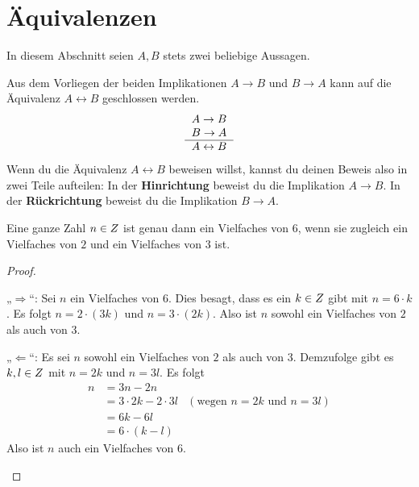 \section{Äquivalenzen}


In diesem Abschnitt seien $A,B$ stets zwei beliebige Aussagen.


\begin{axiom} \label{hinruck}   
    Aus dem Vorliegen der beiden Implikationen $A\to B$ und $B\to A$ kann auf die Äquivalenz $A\leftrightarrow B$ geschlossen werden.
    \[\begin{tabular}{r}
        $A\to B$ \\
        $B\to A$ \\
        \hline
        $A\leftrightarrow B$
    \end{tabular}\]
    Wenn du die Äquivalenz $A\leftrightarrow B$ beweisen willst, kannst du deinen Beweis also in zwei Teile aufteilen: In der \textbf{Hinrichtung} beweist du die Implikation $A\to B$. In der \textbf{Rückrichtung} beweist du die Implikation $B\to A$.
\end{axiom}


\begin{bsp} \label{bsp:hinruck}
    Eine ganze Zahl $n\in \relax Z$ ist genau dann ein Vielfaches von $6$, wenn sie zugleich ein Vielfaches von $2$ und ein Vielfaches von $3$ ist.
\end{bsp}
\begin{proof}
    \begin{labeling}
        \item[„$\Rightarrow$“:] Sei $n$ ein Vielfaches von $6$. Dies besagt, dass es ein $k\in \relax Z$ gibt mit $n=6\cdot k$. Es folgt $n=2\cdot (3k)$ und $n=3\cdot (2k)$. Also ist $n$ sowohl ein Vielfaches von $2$ als auch von $3$.
        \item[„$\Leftarrow$“:] Es sei $n$ sowohl ein Vielfaches von $2$ als auch von $3$. Demzufolge gibt es $k,l\in \relax Z$ mit $n=2k$ und $n=3l$. Es folgt
        \begin{align*}
            n & = 3n - 2n \\
            & = 3\cdot 2k - 2\cdot 3l & (\text{wegen $n=2k$ und $n=3l$})\\
            & = 6k - 6l \\
            & = 6\cdot (k-l)
        \end{align*}
        Also ist $n$ auch ein Vielfaches von $6$. \qedhere
    \end{labeling}
\end{proof}


